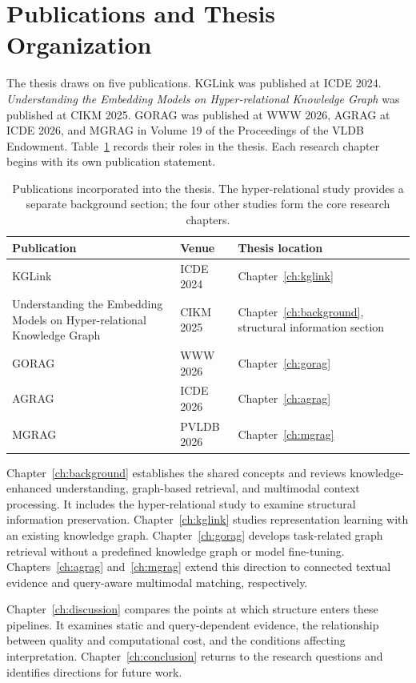 \section{Publications and Thesis Organization}
\label{sec:introduction:organization}
The thesis draws on five publications. KGLink was published at ICDE 2024. \emph{Understanding the Embedding Models on Hyper-relational Knowledge Graph} was published at CIKM 2025. GORAG was published at WWW 2026, AGRAG at ICDE 2026, and MGRAG in Volume 19 of the Proceedings of the VLDB Endowment. Table~\ref{tab:introduction:publications} records their roles in the thesis. Each research chapter begins with its own publication statement.

\begin{table}[tbp]
\centering\small
\caption{Publications incorporated into the thesis. The hyper-relational study provides a separate background section; the four other studies form the core research chapters.}
\label{tab:introduction:publications}
\begin{tabular}{p{}p{}p{}}
\toprule
Publication & Venue & Thesis location\\
\midrule
KGLink~\cite{kglink-publication} & ICDE 2024 & Chapter~\ref{ch:kglink}\\
Understanding the Embedding Models on Hyper-relational Knowledge Graph~\cite{bg-hyperkg} & CIKM 2025 & Chapter~\ref{ch:background}, structural information section\\
GORAG~\cite{gorag-paper} & WWW 2026 & Chapter~\ref{ch:gorag}\\
AGRAG~\cite{agrag-paper} & ICDE 2026 & Chapter~\ref{ch:agrag}\\
MGRAG~\cite{mgrag-paper} & PVLDB 2026 & Chapter~\ref{ch:mgrag}\\
\bottomrule
\end{tabular}
\end{table}

Chapter~\ref{ch:background} establishes the shared concepts and reviews knowledge-enhanced understanding, graph-based retrieval, and multimodal context processing. It includes the hyper-relational study to examine structural information preservation. Chapter~\ref{ch:kglink} studies representation learning with an existing knowledge graph. Chapter~\ref{ch:gorag} develops task-related graph retrieval without a predefined knowledge graph or model fine-tuning. Chapters~\ref{ch:agrag} and~\ref{ch:mgrag} extend this direction to connected textual evidence and query-aware multimodal matching, respectively.

Chapter~\ref{ch:discussion} compares the points at which structure enters these pipelines. It examines static and query-dependent evidence, the relationship between quality and computational cost, and the conditions affecting interpretation. Chapter~\ref{ch:conclusion} returns to the research questions and identifies directions for future work.
